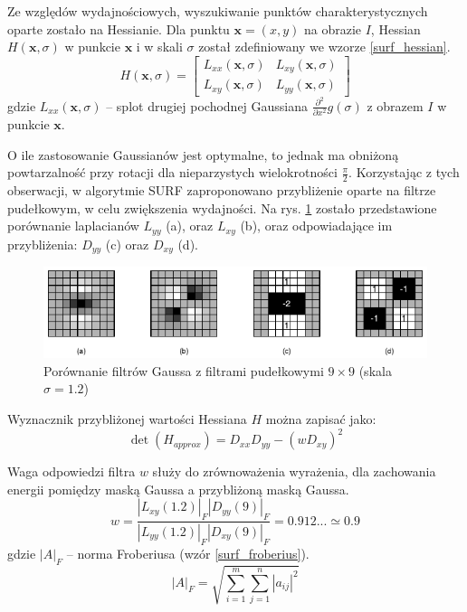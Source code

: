 Ze względów wydajnościowych, wyszukiwanie punktów charakterystycznych oparte zostało na Hessianie. Dla punktu $\boldsymbol{x}=(x, y)$ na obrazie $I$, Hessian $H(\boldsymbol{x}, \sigma)$ w punkcie $\boldsymbol{x}$ i w skali $\sigma$ został zdefiniowany we wzorze \ref{surf_hessian}.
\begin{equation} 
\label{surf_hessian} 
H(\boldsymbol{x}, \sigma) = 
	\begin{bmatrix}
		L_{xx}(\boldsymbol{x}, \sigma) & L_{xy}(\boldsymbol{x}, \sigma) \\
		L_{xy}(\boldsymbol{x}, \sigma) & L_{yy}(\boldsymbol{x}, \sigma)
	\end{bmatrix}
\end{equation} gdzie $L_{xx}(\boldsymbol{x}, \sigma)$ -- splot drugiej pochodnej Gaussiana $\frac{\partial^2}{\partial x^2} g(\sigma)$ z obrazem $I$ w punkcie $\boldsymbol{x}$.

O ile zastosowanie Gaussianów jest optymalne\cite{LINDENBERG90}, to jednak ma obniżoną powtarzalność przy rotacji dla nieparzystych wielokrotności $\frac{\pi}{2}$. Korzystając z tych obserwacji, w algorytmie SURF zaproponowano przybliżenie oparte na filtrze pudełkowym, w celu zwiększenia wydajności. Na rys. \ref{fig:surf-box-filters} zostało przedstawione porównanie laplacianów $L_{yy}$ (a), oraz $L_{xy}$ (b), oraz odpowiadające im przybliżenia: $D_{yy}$ (c) oraz $D_{xy}$ (d).

\begin{figure}[h]
	\centering
	\includegraphics[scale=1.7]{graphics/01_podstawy_teoretyczne/surf-box-filters.pdf}
	\caption{Porównanie filtrów Gaussa z filtrami pudełkowymi $9 \times 9$ (skala $\sigma = 1.2$) \cite{BAY08}}
	\label{fig:surf-box-filters}
\end{figure}

Wyznacznik przybliżonej wartości Hessiana $H$ można zapisać jako:
\begin{equation} 
\label{surf_hessian_det}
\det(H_{approx}) = D_{xx} D_{yy} - (w D_{xy})^2
\end{equation}

Waga odpowiedzi filtra $w$ służy do zrównoważenia wyrażenia, dla zachowania energii pomiędzy maską Gaussa a przybliżoną maską Gaussa.
\begin{equation} 
\label{surf_hessian_approx_w}
w = \frac{|L_{xy}(1.2)|_F |D_{yy}(9)|_F}{|L_{yy}(1.2)|_F |D_{xy}(9)|_F} = 0.912... \simeq 0.9
\end{equation} gdzie $|A|_F$ -- norma Froberiusa (wzór \ref{surf_froberius}).
\begin{equation} 
\label{surf_froberius}
|A|_F = \sqrt{\sum\limits_{i=1}^m \sum\limits_{j=1}^n |a_{ij}|^2}
\end{equation}

